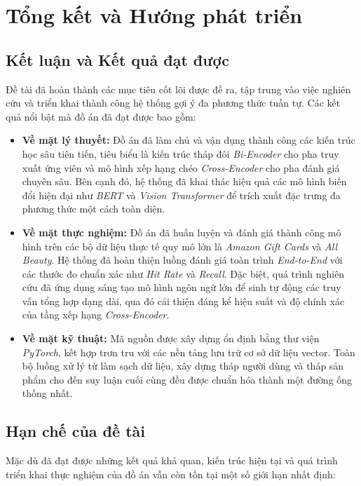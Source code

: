 \chapter{Tổng kết và Hướng phát triển}

\section{Kết luận và Kết quả đạt được}

Đề tài đã hoàn thành các mục tiêu cốt lõi được đề ra, tập trung vào việc nghiên cứu và triển khai thành công hệ thống gợi ý đa phương thức tuần tự. Các kết quả nổi bật mà đồ án đã đạt được bao gồm:

\begin{itemize}
    \item \textbf{Về mặt lý thuyết:} Đồ án đã làm chủ và vận dụng thành công các kiến trúc học sâu tiên tiến, tiêu biểu là kiến trúc tháp đôi \textit{Bi-Encoder} cho pha truy xuất ứng viên và mô hình xếp hạng chéo \textit{Cross-Encoder} cho pha đánh giá chuyên sâu. Bên cạnh đó, hệ thống đã khai thác hiệu quả các mô hình biến đổi hiện đại như \textit{BERT} và \textit{Vision Transformer} để trích xuất đặc trưng đa phương thức một cách toàn diện.
    \item \textbf{Về mặt thực nghiệm:} Đồ án đã huấn luyện và đánh giá thành công mô hình trên các bộ dữ liệu thực tế quy mô lớn là \textit{Amazon Gift Cards} và \textit{All Beauty}. Hệ thống đã hoàn thiện luồng đánh giá toàn trình \textit{End-to-End} với các thước đo chuẩn xác như \textit{Hit Rate} và \textit{Recall}. Đặc biệt, quá trình nghiên cứu đã ứng dụng sáng tạo mô hình ngôn ngữ lớn để sinh tự động các truy vấn tổng hợp dạng dài, qua đó cải thiện đáng kể hiệu suất và độ chính xác của tầng xếp hạng \textit{Cross-Encoder}.
    \item \textbf{Về mặt kỹ thuật:} Mã nguồn được xây dựng ổn định bằng thư viện \textit{PyTorch}, kết hợp trơn tru với các nền tảng lưu trữ cơ sở dữ liệu vector. Toàn bộ luồng xử lý từ làm sạch dữ liệu, xây dựng tháp người dùng và tháp sản phẩm cho đến suy luận cuối cùng đều được chuẩn hóa thành một đường ống thống nhất.
\end{itemize}

\section{Hạn chế của đề tài}

Mặc dù đã đạt được những kết quả khả quan, kiến trúc hiện tại và quá trình triển khai thực nghiệm của đồ án vẫn còn tồn tại một số giới hạn nhất định:

